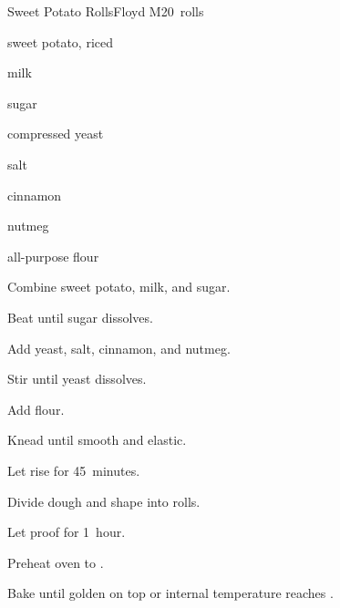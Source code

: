\begin{recipe}{Sweet Potato Rolls}{Floyd M}{20~rolls}

\begin{ingredients}
\item {} sweet potato, riced
\item {} milk
\item \C{\half} sugar
\item {} compressed yeast
\item {} salt
\item \tp{\half} cinnamon
\item \tp{\eighth} nutmeg
\item {} all-purpose flour
\end{ingredients}

\begin{directions}
\item Combine sweet potato, milk, and sugar.
\item Beat until sugar dissolves.
\item Add yeast, salt, cinnamon, and nutmeg.
\item Stir until yeast dissolves.
\item Add flour.
\item Knead until smooth and elastic.
\item Let rise for 45~minutes.
\item Divide dough and shape into rolls.
\item Let proof for 1~hour.
\item Preheat oven to .
\item Bake until golden on top or internal temperature reaches .
\end{directions}

\end{recipe}
